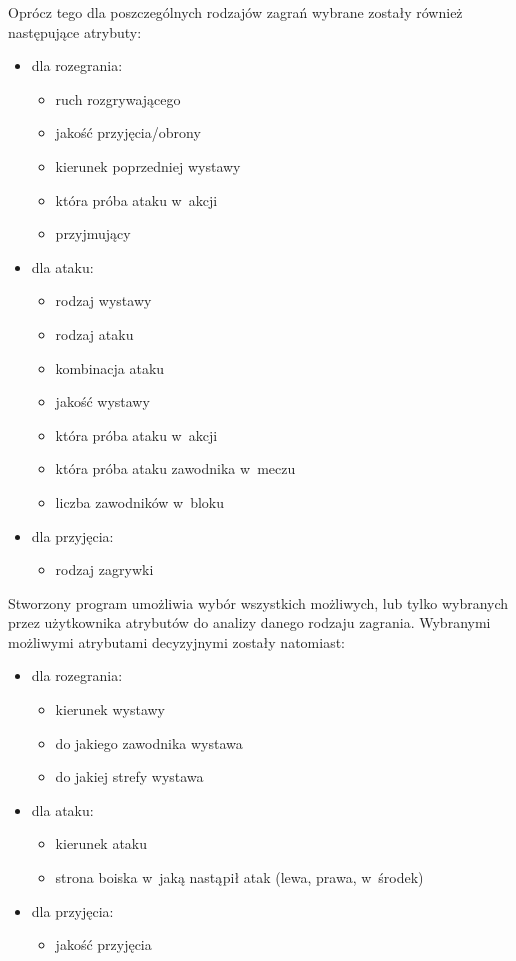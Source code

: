 \documentclass[a4paper,twoside,12pt]{book}
\begin{document}
Oprócz tego dla poszczególnych rodzajów zagrań wybrane zostały również następujące atrybuty:
\begin{itemize}
\item dla rozegrania:
\begin{itemize}
\item ruch rozgrywającego
\item jakość przyjęcia/obrony
\item kierunek poprzedniej wystawy
\item która próba ataku w~akcji
\item przyjmujący
\end{itemize}
\item dla ataku:
\begin{itemize}
\item rodzaj wystawy
\item rodzaj ataku
\item kombinacja ataku
\item jakość wystawy
\item która próba ataku w~akcji
\item która próba ataku zawodnika w~meczu
\item liczba zawodników w~bloku
\end{itemize}
\item dla przyjęcia:
\begin{itemize}
\item rodzaj zagrywki
\end{itemize}
\end{itemize}
Stworzony program umożliwia wybór wszystkich możliwych, lub tylko wybranych przez użytkownika atrybutów do analizy danego rodzaju zagrania. Wybranymi możliwymi atrybutami decyzyjnymi zostały natomiast:
\begin{itemize}
\item dla rozegrania:
\begin{itemize}
\item kierunek wystawy
\item do jakiego zawodnika wystawa
\item do jakiej strefy wystawa
\end{itemize}
\item dla ataku:
\begin{itemize}
\item kierunek ataku
\item strona boiska w~jaką nastąpił atak (lewa, prawa, w~środek)
\end{itemize}
\item dla przyjęcia:
\begin{itemize}
\item jakość przyjęcia
\end{itemize}
\end{itemize}
\end{document}
